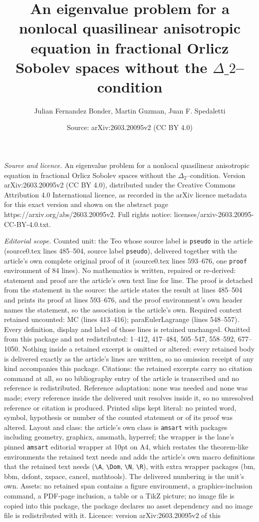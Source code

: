 \documentclass[10pt,a4paper]{amsart}
\title[An eigenvalue problem for a nonlocal quasilinear anisotropic]{An eigenvalue problem for a nonlocal quasilinear anisotropic equation in fractional Orlicz Sobolev spaces without the $\Delta\_2$--condition}
\author{Julian Fernandez Bonder, Martin Guzman, Juan F. Spedaletti}
\date{Source: arXiv:2603.20095v2 (CC BY 4.0)}
\begin{document}
\maketitle

\noindent\emph{Source and licence.} An eigenvalue problem for a nonlocal quasilinear anisotropic equation in fractional Orlicz Sobolev spaces without the $\Delta_2$--condition. Version arXiv:2603.20095v2 (CC BY 4.0), distributed under the Creative Commons Attribution 4.0 International licence, as recorded in the arXiv licence metadata for this exact version and shown on the abstract page https://arxiv.org/abs/2603.20095v2. Full rights notice: licenses/arxiv-2603.20095-CC-BY-4.0.txt.\par\smallskip

\noindent\textit{Editorial scope.} Counted unit: the Teo whose source label is \texttt{pseudo} in the article (source0.tex lines 485--504, source label \texttt{pseudo}), delivered together with the article's own complete original proof of it (source0.tex lines 593--676, one \texttt{proof} environment of 84 lines). No mathematics is written, repaired or re-derived: statement and proof are the article's own text line for line. The proof is detached from the statement in the source: the article states the result at lines 485--504 and prints its proof at lines 593--676, and the proof environment's own header names the statement, so the association is the article's own. Required context retained uncounted: MC (lines 413--416); paraEulerLagrange (lines 548--557). Every definition, display and label of those lines is retained unchanged. Omitted from this package and not redistributed: 1--412, 417--484, 505--547, 558--592, 677--1050. Nothing inside a retained excerpt is omitted or altered: every retained body is delivered exactly as the article's lines are written, so no omission receipt of any kind accompanies this package. Citations: the retained excerpts carry no citation command at all, so no bibliography entry of the article is transcribed and no reference is redistributed. Reference adaptation: none was needed and none was made; every reference inside the delivered unit resolves inside it, so no unresolved reference or citation is produced. Printed slips kept literal: no printed word, symbol, hypothesis or number of the counted statement or of its proof was altered. Layout and class: the article's own class is \texttt{amsart} with packages including geometry, graphicx, amsmath, hyperref; the wrapper is the lane's pinned \texttt{amsart} editorial wrapper at 10pt on A4, which restates the theorem-like environments the retained text needs and adds the article's own macro definitions that the retained text needs (\texttt{\textbackslash A}, \texttt{\textbackslash Dom}, \texttt{\textbackslash N}, \texttt{\textbackslash R}), with extra wrapper packages (bm, bbm, dsfont, xspace, cancel, mathtools). The delivered numbering is the unit's own. Assets: no retained span contains a figure environment, a graphics-inclusion command, a PDF-page inclusion, a table or a TikZ picture; no image file is copied into this package, the package declares no asset dependency and no image file is redistributed with it. Licence: version arXiv:2603.20095v2 of this 
\end{document}
